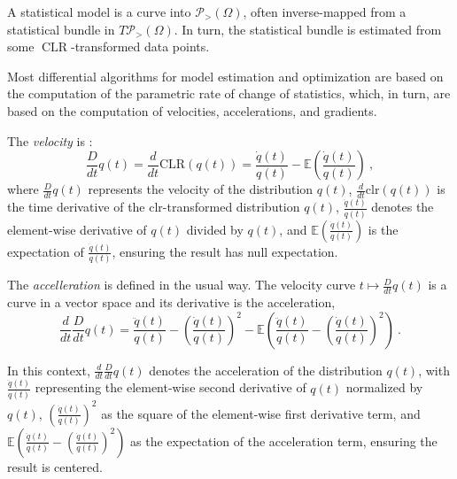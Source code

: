 \documentclass[axioms,article,submit,pdftex,moreauthors]{Definitions/mdpi}
\theoremstyle{plain}
\theoremstyle{remark}
\newcommand{\CLR}{\operatorname{CLR}}
\newcommand{\pdensitieson}[1]{\mathcal P_{>}\left(#1\right)}
\begin{document}

A statistical model is a curve into $\pdensitieson\Omega$, often inverse-mapped from a statistical bundle in $T \pdensitieson\Omega$. In turn, the statistical bundle is estimated from some $\CLR$-transformed data points. 

Most differential algorithms for model estimation and optimization are based on the computation of the parametric rate of change of statistics, which, in turn, are based on the computation of velocities, accelerations, and gradients.

The \emph{velocity} is :
\begin{equation*} 
\frac{D}{dt} q(t) = \frac{d}{dt} \text{CLR}(q(t)) = \frac{\dot{q}(t)}{q(t)} - \mathbb{E} \left( \frac{\dot{q}(t)}{q(t)} \right) \ ,
\end{equation*} 
where  $\frac{D}{dt} q(t)$ represents the velocity of the distribution $q(t)$, $\frac{d}{dt} \text{clr}(q(t))$ is the time derivative of the clr-transformed distribution $q(t)$,
 $\frac{\dot{q}(t)}{q(t)}$ denotes the element-wise derivative of $q(t)$ divided by $q(t)$, and 
    $\mathbb{E} \left( \frac{\dot{q}(t)}{q(t)} \right)$ is the expectation of $\frac{\dot{q}(t)}{q(t)}$, ensuring the result has null expectation.

The \emph{accelleration} is defined in the usual way. The velocity curve $t \mapsto \frac{D}{dt} q(t)$ is a curve in a vector space and its derivative is the acceleration,
\begin{equation*} 
\frac{d}{dt} \frac{D}{dt} q(t) = \frac{\ddot{q}(t)}{q(t)} - \left( \frac{\dot{q}(t)}{q(t)} \right)^2 - \mathbb{E} \left( \frac{\ddot{q}(t)}{q(t)} - \left( \frac{\dot{q}(t)}{q(t)} \right)^2 \right) \ .
\end{equation*} 

In this context, \( \frac{d}{dt} \frac{D}{dt} q(t) \) denotes the acceleration of the distribution \( q(t) \), with \( \frac{\ddot{q}(t)}{q(t)} \) representing the element-wise second derivative of \( q(t) \) normalized by \( q(t) \), \( \left( \frac{\dot{q}(t)}{q(t)} \right)^2 \) as the square of the element-wise first derivative term, and \( \mathbb{E} \left( \frac{\ddot{q}(t)}{q(t)} - \left( \frac{\dot{q}(t)}{q(t)} \right)^2 \right) \) as the expectation of the acceleration term, ensuring the result is centered.
\end{document}

